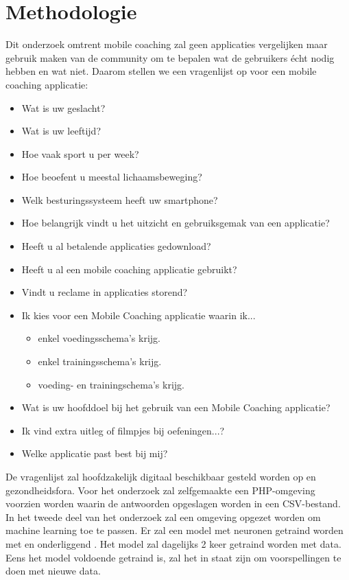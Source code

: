 


\section{Methodologie}
\label{sec:methodologie}
Dit onderzoek omtrent mobile coaching zal geen applicaties vergelijken maar gebruik maken van de community om te bepalen wat de gebruikers écht nodig hebben en wat niet. Daarom stellen we een vragenlijst op voor een mobile coaching applicatie: 
\begin{itemize}
\item Wat is uw geslacht?
\item Wat is uw leeftijd?
\item Hoe vaak sport u per week?
\item Hoe beoefent u meestal lichaamsbeweging?
\item Welk besturingssysteem heeft uw smartphone?
\item Hoe belangrijk vindt u het uitzicht en gebruiksgemak van een applicatie?
\item Heeft u al betalende applicaties gedownload?
\item Heeft u al een mobile coaching applicatie gebruikt?
\item Vindt u reclame in applicaties storend?
\item Ik kies voor een Mobile Coaching applicatie waarin ik...  
\begin{itemize}
\item enkel voedingsschema's krijg.
\item enkel trainingsschema's krijg.
\item voeding- en trainingschema's krijg.
\end{itemize}
\item Wat is uw hoofddoel bij het gebruik van een Mobile Coaching applicatie?
\item Ik vind extra uitleg of filmpjes bij oefeningen...?
\item Welke applicatie past best bij mij?
\end{itemize}
 De vragenlijst zal hoofdzakelijk digitaal beschikbaar gesteld worden op \textcite{Facebook} en gezondheidsfora.  Voor het onderzoek zal zelfgemaakte een PHP-omgeving voorzien worden waarin de antwoorden opgeslagen worden in een CSV-bestand. \hfill \break \break 
 In het tweede deel van het onderzoek zal een \textcite{Python} omgeving opgezet worden om machine learning toe te passen. Er zal een model met neuronen getraind worden met \textcite{Keras} en onderliggend \textcite{TensorFlow}. Het model zal dagelijks 2 keer getraind worden met data. Eens het model voldoende getraind is, zal het in staat zijn om voorspellingen te doen met nieuwe data.

